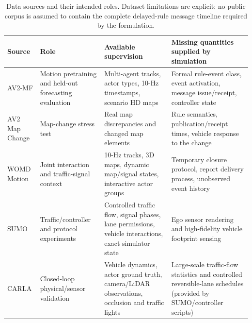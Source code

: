 \documentclass[letterpaper]{article} %
\begin{document}
\begin{table}[t]
\centering\small
\begin{tabular}{@{}p{}p{}p{}p{}@{}}
\toprule
Source & Role & Available supervision & Missing quantities supplied by simulation \\
\midrule
AV2-MF & Motion pretraining and held-out forecasting evaluation & Multi-agent tracks, actor types, 10-Hz timestamps, scenario HD maps & Formal rule-event class, event activation, message issue/receipt, controller state \\
AV2 Map Change & Map-change stress test & Real map discrepancies and changed map elements & Rule semantics, publication/receipt times, vehicle response to the change \\
WOMD Motion & Joint interaction and traffic-signal context & 10-Hz tracks, 3D maps, dynamic map/signal states, interactive actor groups & Temporary closure protocol, report delivery process, unobserved event history \\
SUMO & Traffic/controller and protocol experiments & Controlled traffic flow, signal phases, lane permissions, vehicle interactions, exact simulator state & Ego sensor rendering and high-fidelity vehicle footprint sensing \\
CARLA & Closed-loop physical/sensor validation & Vehicle dynamics, actor ground truth, camera/LiDAR observations, occlusion and traffic lights & Large-scale traffic-flow statistics and controlled reversible-lane schedules (provided by SUMO/controller scripts) \\
\bottomrule
\end{tabular}
\caption{Data sources and their intended roles. Dataset limitations are explicit: no public corpus is assumed to contain the complete delayed-rule message timeline required by the formulation.}
\label{tab:data-sources}
\end{table}
\end{document}
